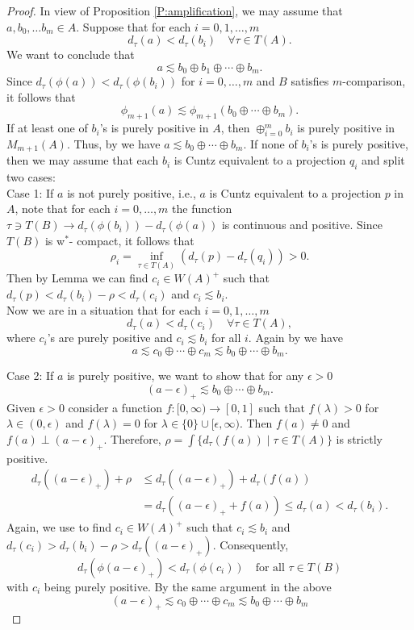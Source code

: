 \documentclass[12pt]{amsart}
\theoremstyle{plain}
\theoremstyle{definition}
\numberwithin{equation}{section}
\begin{document}
\begin{proof}
In view of Proposition \ref{P:amplification}, we may assume that $a, b_0, \dots b_m \in A$. Suppose that for each $i=0, 1, \dots, m$ \[d_{\tau} (a)< d_{\tau}(b_i)   \quad \forall \tau \in T(A).\]  We want to conclude that 
\[ a \lesssim b_0 \oplus b_1 \oplus \cdots \oplus b_m. \] 
Since $\displaystyle d_{\tau}(\phi(a)) < d_{\tau}(\phi(b_i))$ for $i=0, \dots, m$ and $B$ satisfies $m$-comparison, it follows that 
\[ \phi_{m+1} (a) \lesssim \phi_{m+1} (b_0\oplus \cdots \oplus b_m).\]
If at least one of $b_i$'s is purely positive in $A$, then $ \oplus_{i=0}^m b_i$ is purely positive in $M_{m+1}(A)$.  Thus, 
by \cite[Proposition 2.18]{LO} we have $a \lesssim b_0 \oplus \cdots \oplus b_{m}$. 
If none of $b_i$'s  is purely positive, then we may assume that each $b_i$ is Cuntz equivalent to a projection $q_i$ and split two cases: \\
Case 1: If $a$ is not purely positive, i.e., $a$ is Cuntz equivalent to a projection $p$ in $A$, note that for each $i=0, \dots, m$
the function $\tau \ni T(B) \to d_{\tau} (\phi(b_i)) -d_{\tau}(\phi(a))$ is continuous and positive. Since $T(B)$ is w$^*$- compact, it follows that  
\begin{equation}
\rho_i=  \inf_{\tau \in T(A)} (d_{\tau}(p) - d_{\tau}(q_i))> 0.
\end{equation}
Then by Lemma \cite[Lemma 2.21]{LO} we can find $c_i \in W(A)^{+}$ such that $d_{\tau} (p) < d_{\tau}(b_i)- \rho<  d_{\tau}(c_i)$ and $c_i \lesssim b_i$. \\
Now we are in a situation that for each $i=0, 1, \dots, m$ \[d_{\tau} (a)< d_{\tau}(c_i)   \quad \forall \tau \in T(A),\] where $c_i$'s are purely positive and $c_i \lesssim b_i$ for all $i$.  Again by \cite[Proposition 2.18]{LO} 
we have 
\[ a \lesssim c_0 \oplus \cdots \oplus c_m \lesssim b_0 \oplus \cdots \oplus b_m.\]

Case 2: If $a$ is purely positive, we want to show that for any $\epsilon >0$ 
\[(a-\epsilon)_{+} \lesssim b_0 \oplus \cdots \oplus b_m.\]
Given $\epsilon >0$ consider a function $f:[0, \infty) \to [0,1]$ such that $f(\lambda)>0$ for $\lambda \in (0, \epsilon)$ and $f(\lambda)=0$ for $\lambda \in \{ 0\} \cup [\epsilon, \infty)$. Then $f(a) \neq 0$ and $f(a) \perp (a-\epsilon)_{+}$.
Therefore, $\rho=\int \{d_{\tau} (f(a))\mid \tau \in T(A) \}$ is strictly positive. 
\[
\begin{split}
d_{\tau}((a-\epsilon)_{+})+ \rho &\le d_{\tau}((a-\epsilon)_{+})+ d_{\tau}(f(a)) \\
&=d_{\tau}((a-\epsilon)_{+}+ f(a)) \le d_{\tau}(a) < d_{\tau}(b_i).
\end{split}
\]
Again, we use \cite[Lemma 2.21]{LO} to find $c_i \in W(A)^{+}$ such that $c_i \lesssim b_i$ and $d_{\tau} (c_i)> d_{\tau}(b_i) -\rho > d_{\tau}((a-\epsilon)_{+})$. Consequently, 
\[d_{\tau}(\phi(a-\epsilon)_{+}) < d_{\tau}(\phi (c_i)) \quad \text{for all $\tau \in T(B)$}\] with $c_i$ being purely positive.  By the same argument in the above 
\[ (a-\epsilon)_{+} \lesssim  c_0 \oplus \cdots \oplus c_m \lesssim b_0 \oplus \cdots \oplus b_m\] 

\end{proof} 
\end{document}
